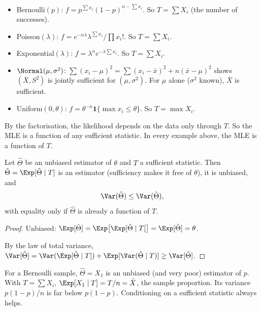 \begin{example}
\begin{itemize}
  \item Bernoulli$(p)$: $f=p^{\sum x_i}(1-p)^{n-\sum x_i}$. So $T=\sum X_i$ (the number of successes).
  \item Poisson$(\lambda)$: $f=e^{-n\lambda}\lambda^{\sum x_i}/\prod x_i!$. So $T=\sum X_i$.
  \item Exponential$(\lambda)$: $f=\lambda^ne^{-\lambda\sum x_i}$. So $T=\sum X_i$.
  \item $\Normal(\mu,\sigma^2)$: $\sum(x_i-\mu)^2=\sum(x_i-\bar{x})^2+n(\bar{x}-\mu)^2$ shows $(\bar{X},S^2)$ is jointly sufficient for $(\mu,\sigma^2)$. For $\mu$ alone ($\sigma^2$ known), $\bar{X}$ is sufficient.
  \item Uniform$(0,\theta)$: $f=\theta^{-n}\mathbf{1}\{\max x_i\le\theta\}$. So $T=\max X_i$.
\end{itemize}
\end{example}

By the factorisation, the likelihood depends on the data only through $T$. So the MLE is a function of any sufficient statistic. In every example above, the MLE is a function of $T$.

\begin{theorem}\label{thm:rb}
Let $\hat\Theta$ be an unbiased estimator of $\theta$ and $T$ a sufficient statistic. Then $\tilde\Theta=\Exp[\hat\Theta\mid T]$ is an estimator (sufficiency makes it free of $\theta$), it is unbiased, and
\[ \Var(\tilde\Theta)\le\Var(\hat\Theta), \]
with equality only if $\hat\Theta$ is already a function of $T$.
\end{theorem}

\begin{proof}
Unbiased: $\Exp[\tilde\Theta]=\Exp\big[\Exp[\hat\Theta\mid T]\big]=\Exp[\hat\Theta]=\theta$.

By the law of total variance, $\Var[\hat\Theta]=\Var(\Exp[\hat\Theta\mid T])+\Exp[\Var(\hat\Theta\mid T)]\ge\Var[\tilde\Theta]$.
\end{proof}

\begin{example}
For a Bernoulli sample, $\hat\Theta=X_1$ is an unbiased (and very poor) estimator of $p$. With $T=\sum X_i$, $\Exp[X_1\mid T]=T/n=\bar{X}$, the sample proportion. Its variance $p(1-p)/n$ is far below $p(1-p)$. Conditioning on a sufficient statistic always helps.
\end{example}

